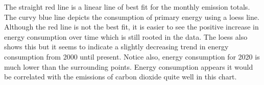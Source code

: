 \documentclass[
]{article}
\newenvironment{Shaded}{\begin{snugshade}}{\end{snugshade}}
\newcommand{\DataTypeTok}[1]{\textcolor[rgb]{0.13,0.29,0.53}{#1}}
\newcommand{\DecValTok}[1]{\textcolor[rgb]{0.00,0.00,0.81}{#1}}
\newcommand{\FloatTok}[1]{\textcolor[rgb]{0.00,0.00,0.81}{#1}}
\newcommand{\KeywordTok}[1]{\textcolor[rgb]{0.13,0.29,0.53}{\textbf{#1}}}
\newcommand{\NormalTok}[1]{#1}
\newcommand{\OperatorTok}[1]{\textcolor[rgb]{0.81,0.36,0.00}{\textbf{#1}}}
\newcommand{\StringTok}[1]{\textcolor[rgb]{0.31,0.60,0.02}{#1}}
\begin{document}
The straight red line is a linear line of best fit for the monthly
emission totals. The curvy blue line depicts the consumption of primary
energy using a loess line. Although the red line is not the best fit, it
is easier to see the positive increase in energy consumption over time
which is still rooted in the data. The loess also shows this but it
seems to indicate a slightly decreasing trend in energy consumption from
2000 until present. Notice also, energy consumption for 2020 is much
lower than the surrounding points. Energy consumption appears it would
be correlated with the emissions of carbon dioxide quite well in this
chart.

\begin{Shaded}
\end{Shaded}
\end{document}
